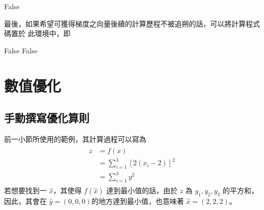 \documentclass[letterpaper,10pt,english]{sphinxmanual}
\begin{document}
\begin{sphinxVerbatim}[commandchars=\\\{\}]
  
\end{sphinxVerbatim}

\begin{sphinxVerbatim}[commandchars=\\\{\}]
False
\end{sphinxVerbatim}

最後，如果希望可獲得梯度之向量後續的計算歷程不被追朔的話，可以將計算程式碼置於  此環境中，即

\begin{sphinxVerbatim}[commandchars=\\\{\}]
 
          
        
\end{sphinxVerbatim}

\begin{sphinxVerbatim}[commandchars=\\\{\}]
False
False
\end{sphinxVerbatim}


\section{數值優化}
\label{\detokenize{notebook/lab-torch-diff-opt:id5}}

\subsection{手動撰寫優化算則}
\label{\detokenize{notebook/lab-torch-diff-opt:id6}}
前一小節所使用的範例，其計算過程可以寫為
\begin{equation*}
\begin{split}
\begin{aligned}
z &= f(x)\\
 &= \sum_{i=1}^3\left[2(x_i-2)\right]^2 \\
 &= \sum_{i=1}^3 y^2
\end{aligned}
\end{split}
\end{equation*}
若想要找到一 \(\widehat{x}\)，其使得 \(f(\widehat{x})\) 達到最小值的話，由於 \(z\) 為 \(y_1, y_2, y_3\) 的平方和，因此，其會在 \(\widehat{y} = (0, 0, 0)\)的地方達到最小值，也意味著 \(\widehat{x} = (2,2,2)\)。
\end{document}
